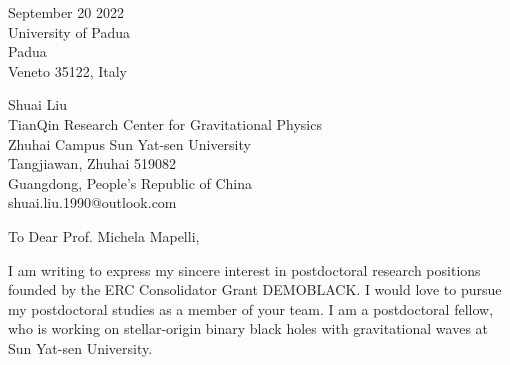\documentclass[11pt,a4paper,sans]{letter} %
\date{}
\begin{document}

\begin{letter}{September 20 2022 \\
University of Padua\\
Padua\\ 
Veneto 35122, Italy}

Shuai Liu \\
TianQin Research Center for Gravitational Physics \\
Zhuhai Campus Sun Yat-sen University \\
Tangjiawan, Zhuhai 519082 \\
Guangdong, People's Republic of China \\
shuai.liu.1990@outlook.com








\opening{To Dear Prof. Michela Mapelli,} 
 
    I am writing to express my sincere interest in postdoctoral research positions founded by the ERC Consolidator Grant
    DEMOBLACK. I would love to
pursue my postdoctoral studies as a member of your team. I am a postdoctoral fellow, who is working on stellar-origin
    binary black holes with
    gravitational waves at Sun Yat-sen University.


\end{letter}
\end{document}
